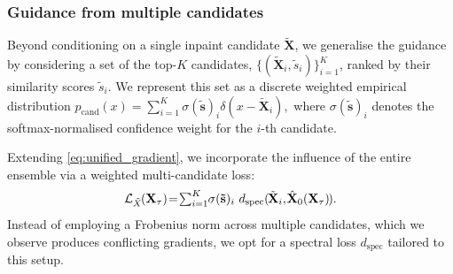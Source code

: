 \documentclass{article}
\begin{document}
\vspace{-3pt}
\subsubsection{Guidance from multiple candidates} \label{sec:multi}
\vspace{-2pt}




Beyond conditioning on a single inpaint candidate $\tilde{\mathbf{X}}$, we generalise the guidance by considering a set of the top-$K$ candidates, $\{(\mathbf{\tilde{X}}_i, \tilde{s}_i)\}^K_{i=1}$, ranked by their similarity scores $\tilde{s}_i$. We represent this set as a discrete weighted empirical distribution $p_{\mathrm{cand}}(x) = \sum^K_{i=1}  \sigma(\mathbf{\tilde{s}})_i \delta(x-\mathbf{\tilde{X}}_i),$ where $ \sigma(\mathbf{\tilde{s}})_i$ denotes the softmax-normalised confidence weight for the $i$-th candidate.


Extending \eqref{eq:unified_gradient}, we incorporate the influence of the entire ensemble via a weighted multi-candidate loss:
\begin{equation}
\textstyle
\mathcal{L}_{\tilde{X}}
\hspace{-1pt}
(\mathbf{X}_\tau)
\hspace{-2pt}
= 
\hspace{-2pt}
\sum^K_{i=1} 
\hspace{-2pt}
\sigma(\mathbf{\tilde{s}})_i \
 d_\mathrm{spec}(
\hspace{-1pt}
\tilde{\mathbf{X}}_i, 
\hspace{-1pt}
\hat{\mathbf{X}}_0(\mathbf{X}_\tau)
\hspace{-1pt}
).
\end{equation} 
Instead of employing a Frobenius norm across multiple candidates, which we observe produces conflicting gradients, we opt for a spectral loss $d_\mathrm{spec}$ tailored to this setup.

\end{document}
